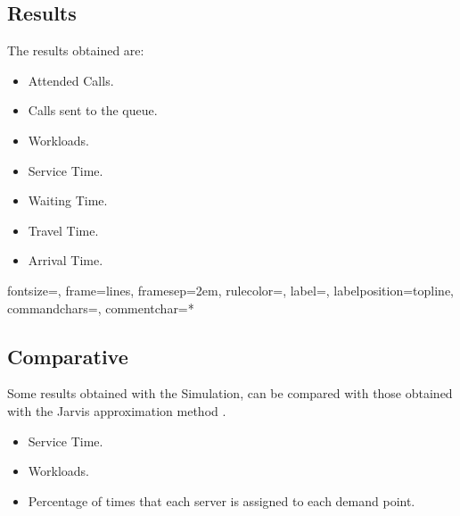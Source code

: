 \subsection{Results}
\begin{frame}
  The results obtained are:
  \begin{itemize}
  \item Attended Calls.
  \item Calls sent to the queue.
  \item Workloads.
  \item Service Time.
  \item Waiting Time.
  \item Travel Time.
  \item Arrival Time.
  \end{itemize}
\end{frame}

{}%
{fontsize=\footnotesize,
 frame=lines,  %
 framesep=2em, %
 rulecolor=\color{Gray},
 label=,
 labelposition=topline,
 commandchars=\|\(\), %
 commentchar=*        %
}

\begin{frame}
\end{frame}

\subsection{Comparative}
\begin{frame}
  Some results obtained with the Simulation,
  can be compared with those
  obtained with the Jarvis approximation method \cite{jarvis1985approximating}. 
  \begin{itemize}
  \item Service Time.
  \item Workloads.
  \item Percentage of times that each server is assigned to each demand point.
  \end{itemize}
\end{frame}
